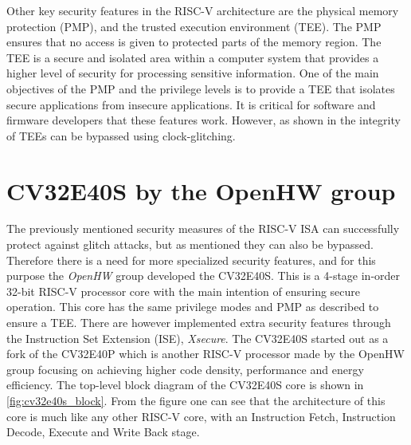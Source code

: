 Other key security features in the RISC-V architecture are the physical memory protection (PMP), and the trusted execution environment (TEE). The PMP ensures that no access is given to protected parts of the memory region. The TEE is a secure and isolated area within a computer system that provides a higher level of security for processing sensitive information. One of the main objectives of the PMP and the privilege levels is to provide a TEE that isolates secure applications from insecure applications. It is critical for software and firmware developers that these features work. However, as shown in \cite{source2} the integrity of TEEs can be bypassed using clock-glitching. 

\section{CV32E40S by the OpenHW group}
\label{sec:cv32}

The previously mentioned security measures of the RISC-V ISA can successfully protect against glitch attacks, but as mentioned they can also be bypassed. Therefore there is a need for more specialized security features, and for this purpose the \textit{OpenHW} group developed the CV32E40S. This is a 4-stage in-order 32-bit RISC-V processor core with the main intention of ensuring secure operation\cite{cv32e40s_manual}. This core has the same privilege modes and PMP as described to ensure a TEE. There are however implemented extra security features through the Instruction Set Extension (ISE), \textit{Xsecure}. The CV32E40S started out as a fork of the CV32E40P which is another RISC-V processor made by the OpenHW group focusing on achieving higher code density, performance and energy efficiency\cite{cv32e40p_manual}. The top-level block diagram of the CV32E40S core is shown in \autoref{fig:cv32e40s_block}. From the figure one can see that the architecture of this core is much like any other RISC-V core, with an Instruction Fetch, Instruction Decode, Execute and Write Back stage. 



